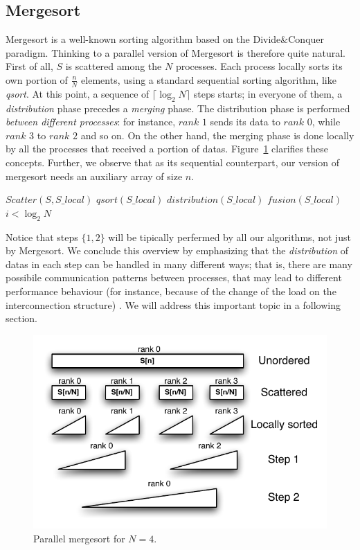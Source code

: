 \subsection{Mergesort}
Mergesort is a well-known sorting algorithm based on the Divide$\&$Conquer paradigm. Thinking to a parallel version of Mergesort is therefore quite natural. First of all, $S$ is scattered among the $N$ processes. Each process locally sorts its own portion of $\frac{n}{N}$ elements, using a standard sequential sorting algorithm, like \textit{qsort}. At this point, a sequence of $\lceil \log_{2}{N} \rceil$ steps starts; in everyone of them, a \textit{distribution} phase precedes a \textit{merging} phase. The distribution phase is performed \textit{between different processes}: for instance, $rank$ $1$ sends its data to $rank$ $0$, while $rank$ $3$ to $rank$ $2$ and so on. On the other hand, the merging phase is done locally by all the processes that received a portion of datas. Figure~\ref{merge-dist} clarifies these concepts. Further, we observe that as its sequential counterpart, our version of mergesort needs an auxiliary array of size $n$. 
\begin{algorithmic}[1]  
	\medskip
	\STATE $Scatter( S, S\_local )$
	\STATE $qsort( S\_local )$
	\REPEAT 
		\STATE $distribution( S\_local )$
		\STATE $fusion ( S\_local )$
	\UNTIL $i < \log_{2}{N}$
	\medskip
\label{alg1}
\end{algorithmic}
Notice that steps $\lbrace 1, 2 \rbrace$ will be tipically perfermed by all our algorithms, not just by Mergesort. We conclude this overview by emphasizing that the \textit{distribution} of datas in each step can be handled in many different ways; that is, there are many possibile communication patterns between processes, that may lead to different performance behaviour (for instance, because of the change of the load on the interconnection structure) . We will address this important topic in a following section.

\begin{figure}[h]
        \centerline{
               \mbox{\includegraphics[scale=0.70]{mergesort-pict1}}
        }
        \caption{Parallel mergesort for $N = 4$.}
        \label{merge-dist}
\end{figure}

